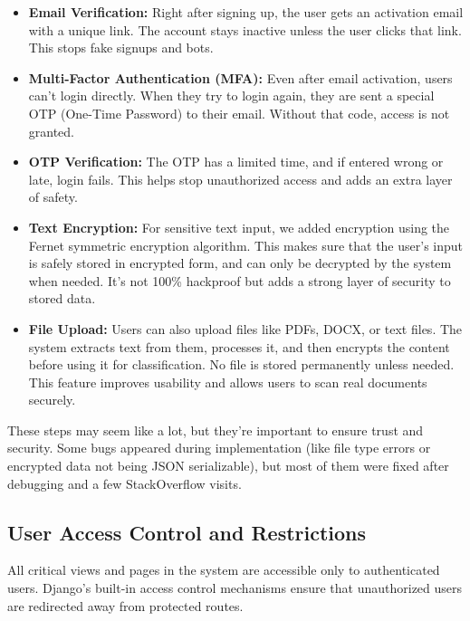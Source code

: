\documentclass[a4paper,12pt]{article}
\begin{document}
\begin{itemize}
    \item \textbf{Email Verification:} Right after signing up, the user gets an activation email with a unique link. The account stays inactive unless the user clicks that link. This stops fake signups and bots.
    
    \item \textbf{Multi-Factor Authentication (MFA):} Even after email activation, users can't login directly. When they try to login again, they are sent a special OTP (One-Time Password) to their email. Without that code, access is not granted.

    \item \textbf{OTP Verification:} The OTP has a limited time, and if entered wrong or late, login fails. This helps stop unauthorized access and adds an extra layer of safety.

    \item \textbf{Text Encryption:} For sensitive text input, we added encryption using the Fernet symmetric encryption algorithm. This makes sure that the user’s input is safely stored in encrypted form, and can only be decrypted by the system when needed. It's not 100\% hackproof but adds a strong layer of security to stored data.

    \item \textbf{File Upload:} Users can also upload files like PDFs, DOCX, or text files. The system extracts text from them, processes it, and then encrypts the content before using it for classification. No file is stored permanently unless needed. This feature improves usability and allows users to scan real documents securely.

\end{itemize}

These steps may seem like a lot, but they're important to ensure trust and security. Some bugs appeared during implementation (like file type errors or encrypted data not being JSON serializable), but most of them were fixed after debugging and a few StackOverflow visits.


\subsection{User Access Control and Restrictions}
All critical views and pages in the system are accessible only to authenticated users. Django's built-in access control mechanisms ensure that unauthorized users are redirected away from protected routes.
\end{document}
